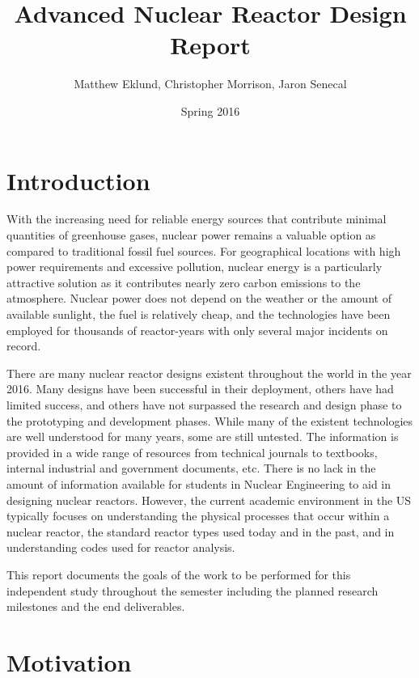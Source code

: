 \documentclass[]{report}
\title{Advanced Nuclear Reactor Design Report}
\author{Matthew Eklund, Christopher Morrison, Jaron Senecal}
\date{Spring 2016}
\begin{document}
\maketitle

\setcounter{chapter}{1}
\section{Introduction}

With the increasing need for reliable energy sources that contribute minimal quantities of greenhouse gases, nuclear power remains a valuable option as compared to traditional fossil fuel sources.  
For geographical locations with high power requirements and excessive pollution, nuclear energy is a particularly attractive solution as it contributes nearly zero carbon emissions to the atmosphere.  
Nuclear power does not depend on the weather or the amount of available sunlight, the fuel is relatively cheap, and the technologies have been employed for thousands of reactor-years %
with only several major incidents on record.

There are many nuclear reactor designs existent throughout the world in the year 2016.  
Many designs have been successful in their deployment, others have had limited success, and others have not surpassed the research and design phase to the prototyping and development phases.  
While many of the existent technologies are well understood for many years, some are still untested.  
The information is provided in a wide range of resources from technical journals to textbooks, internal industrial and government documents, etc.  
There is no lack in the amount of information available for students in Nuclear Engineering to aid in designing nuclear reactors.  
However, the current academic environment in the US typically focuses on understanding the physical processes that occur within a nuclear reactor, the standard reactor types used today and in the past, and in understanding codes used for reactor analysis.  

This report documents the goals of the work to be performed for this independent study throughout the semester including the planned research milestones and the end deliverables.

\section{Motivation}
\end{document}
